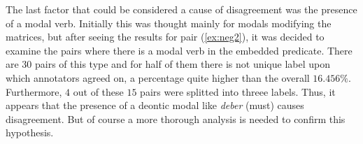 The last factor that could be considered a cause of disagreement was the presence of a modal verb. Initially this was thought mainly for modals modifying the matrices, but after seeing the results for pair (\ref{ex:neg2}), it was decided to examine the pairs where there is a modal verb in the embedded predicate. There are 30 pairs of this type and for half of them there is not unique label upon which annotators agreed on, a percentage quite higher than the overall $16.456\%$. Furthermore, $4$ out of these $15$ pairs were splitted into threee labels. Thus, it appears that the presence of a deontic modal like \textit{deber} (must) causes disagreement. But of course a more thorough analysis is needed to confirm this hypothesis.\\

